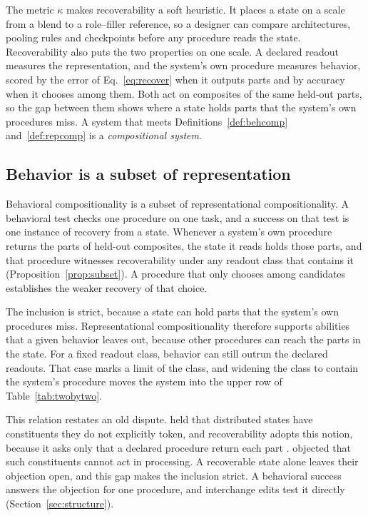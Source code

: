 \documentclass[10pt]{article}
\theoremstyle{plain}
\theoremstyle{remark}
\begin{document}
The metric $\kappa$ makes recoverability a soft heuristic. It places a state on a scale from a blend to a role--filler reference, so a designer can compare architectures, pooling rules and checkpoints before any procedure reads the state. Recoverability also puts the two properties on one scale. A declared readout measures the representation, and the system's own procedure measures behavior, scored by the error of Eq.~\ref{eq:recover} when it outputs parts and by accuracy when it chooses among them. Both act on composites of the same held-out parts, so the gap between them shows where a state holds parts that the system's own procedures miss. A system that meets Definitions~\ref{def:behcomp} and~\ref{def:repcomp} is a \emph{compositional system}.

\subsection{Behavior is a subset of representation}
\label{sec:subset}

Behavioral compositionality is a subset of representational compositionality. A behavioral test checks one procedure on one task, and a success on that test is one instance of recovery from a state. Whenever a system's own procedure returns the parts of held-out composites, the state it reads holds those parts, and that procedure witnesses recoverability under any readout class that contains it (Proposition~\ref{prop:subset}). A procedure that only chooses among candidates establishes the weaker recovery of that choice.

The inclusion is strict, because a state can hold parts that the system's own procedures miss. Representational compositionality therefore supports abilities that a given behavior leaves out, because other procedures can reach the parts in the state. For a fixed readout class, behavior can still outrun the declared readouts. That case marks a limit of the class, and widening the class to contain the system's procedure moves the system into the upper row of Table~\ref{tab:twobytwo}.

This relation restates an old dispute. \citet{smolensky1987} held that distributed states have constituents they do not explicitly token, and recoverability adopts this notion, because it asks only that a declared procedure return each part \citep[cf.][]{vangelder1990}. \citet{fodor1990} objected that such constituents cannot act in processing. A recoverable state alone leaves their objection open, and this gap makes the inclusion strict. A behavioral success answers the objection for one procedure, and interchange edits test it directly (Section~\ref{sec:structure}).
\end{document}
